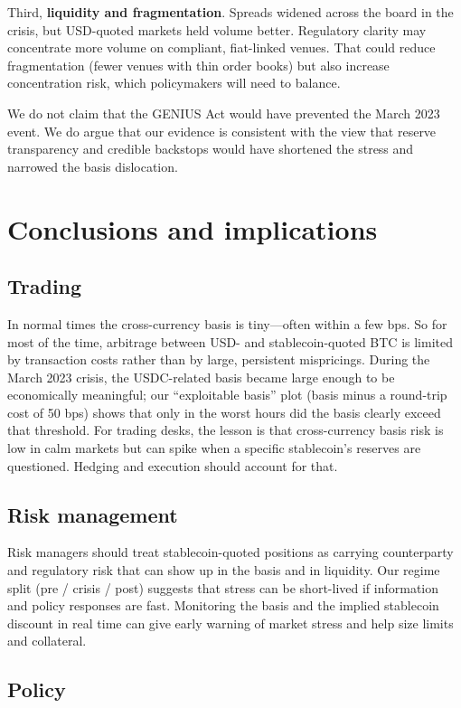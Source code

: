 \documentclass[12pt,oneside,a4paper]{article}
\begin{document}
Third, \textbf{liquidity and fragmentation}. Spreads widened across the board in the crisis, but USD-quoted markets held volume better. Regulatory clarity may concentrate more volume on compliant, fiat-linked venues. That could reduce fragmentation (fewer venues with thin order books) but also increase concentration risk, which policymakers will need to balance.

We do not claim that the GENIUS Act would have prevented the March 2023 event. We do argue that our evidence is consistent with the view that reserve transparency and credible backstops would have shortened the stress and narrowed the basis dislocation.

\section{Conclusions and implications}

\subsection{Trading}

In normal times the cross-currency basis is tiny---often within a few bps. So for most of the time, arbitrage between USD- and stablecoin-quoted BTC is limited by transaction costs rather than by large, persistent mispricings. During the March 2023 crisis, the USDC-related basis became large enough to be economically meaningful; our ``exploitable basis'' plot (basis minus a round-trip cost of 50 bps) shows that only in the worst hours did the basis clearly exceed that threshold. For trading desks, the lesson is that cross-currency basis risk is low in calm markets but can spike when a specific stablecoin's reserves are questioned. Hedging and execution should account for that.

\subsection{Risk management}

Risk managers should treat stablecoin-quoted positions as carrying counterparty and regulatory risk that can show up in the basis and in liquidity. Our regime split (pre / crisis / post) suggests that stress can be short-lived if information and policy responses are fast. Monitoring the basis and the implied stablecoin discount in real time can give early warning of market stress and help size limits and collateral.

\subsection{Policy}
\end{document}
